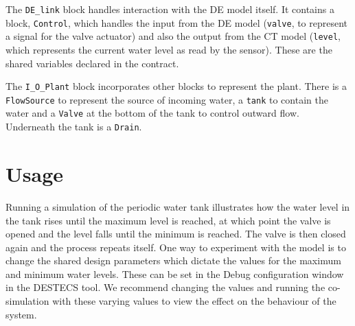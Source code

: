 The \texttt{DE\_link} block handles interaction with the DE
model itself.  It contains a block, \texttt{Control}, which handles
the input from the DE model (\texttt{valve}, to represent a signal for
the valve actuator) and also the output from the CT model
(\texttt{level}, which represents the current water level as read by
the sensor).  These are the shared variables declared in the contract.

The \texttt{I\_O\_Plant} block incorporates other blocks to
represent the plant.  There is a \texttt{Flow\-Sour\-ce} to represent the
source of incoming water, a \texttt{tank} to contain the water and a
\texttt{Valve} at the bottom of the tank to control outward flow.
Underneath the tank is a \texttt{Drain}.

\section{Usage}
Running a simulation of the periodic water tank illustrates how
the water level in the tank rises until the maximum level is reached,
at which point the valve is opened and the level falls until the
minimum is reached.  The valve is then closed again and the process
repeats itself.  One way to experiment with the model is to change the
shared design parameters which dictate the values for the maximum and
minimum water levels.  These can be set in the Debug configuration
window in the DESTECS tool.  We recommend changing the values and
running the co-simulation with these varying values to view the effect
on the behaviour of the system.
